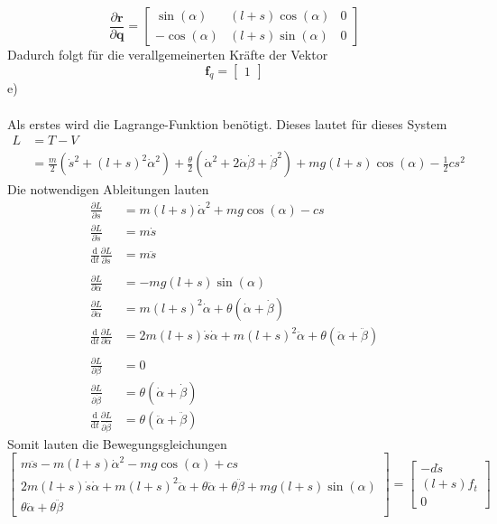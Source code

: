 \[
	\frac{\partial \textbf{r}}{\partial \textbf{q}} = \begin{bmatrix}
		\sin(\alpha) & (l + s)\cos(\alpha) & 0 \\
		-\cos(\alpha) & (l + s)\sin(\alpha) & 0
	\end{bmatrix}	
\]
Dadurch folgt für die verallgemeinerten Kräfte der Vektor
\[
	\textbf{f}_q = \begin{bmatrix}
	1
	\end{bmatrix}
\]
\newpage
\noindent
e)\\ \\
Als erstes wird die Lagrange-Funktion benötigt. Dieses lautet für dieses System
\begin{align*}
	L &= T - V \\
	  &= \frac{m}{2}\left(\dot{s}^2 + (l + s)^2\dot{\alpha}^2\right) + \frac{\theta}{2}\left(\dot{\alpha}^2 + 2\dot{\alpha}\dot{\beta} + \dot{\beta}^2\right) + mg(l + s)\cos(\alpha) - \frac{1}{2}cs^2
\end{align*}
Die notwendigen Ableitungen lauten
\begin{align*}
	\frac{\partial L}{\partial s} &= m(l + s)\dot{\alpha}^2 + mg\cos(\alpha) -cs \\
	\frac{\partial L}{\partial \dot{s}} &= m\dot{s} \\
	\frac{\text{d}}{\text{d}t}\frac{\partial L}{\partial \dot{s}} &= m\ddot{s} 
	\\ \\
	\frac{\partial L}{\partial \alpha} &= -mg(l + s)\sin(\alpha) \\
	\frac{\partial L}{\partial \dot{\alpha}} &= m(l + s)^2\dot{\alpha} + \theta(\dot{\alpha} + \dot{\beta}) \\
	\frac{\text{d}}{\text{d}t}\frac{\partial L}{\partial \dot{\alpha}} &= 2m(l + s)\dot{s}\dot{\alpha} + m(l + s)^2\ddot{\alpha} + \theta(\ddot{\alpha} + \ddot{\beta})
	\\ \\
	\frac{\partial L}{\partial \beta} &= 0 \\
	\frac{\partial L}{\partial \dot{\beta}} &= \theta(\dot{\alpha} + \dot{\beta}) \\
	\frac{\text{d}}{\text{d}t}\frac{\partial L}{\partial \dot{\beta}} &= \theta(\ddot{\alpha} + \ddot{\beta})
\end{align*}
Somit lauten die Bewegungsgleichungen
\[
	\begin{bmatrix}
		m\ddot{s} - m(l + s)\dot{\alpha}^2 - mg\cos(\alpha)	+ cs \\
		2m(l + s)\dot{s}\dot{\alpha} + m(l + s)^2\ddot{\alpha} + \theta\ddot{\alpha} + \theta\ddot{\beta} + mg(l + s)\sin(\alpha) \\
		\theta\ddot{\alpha} + \theta\ddot{\beta}
	\end{bmatrix}
	=
	\begin{bmatrix}
		-d\dot{s} \\
		(l + s)f_t \\
		0
	\end{bmatrix}
\]